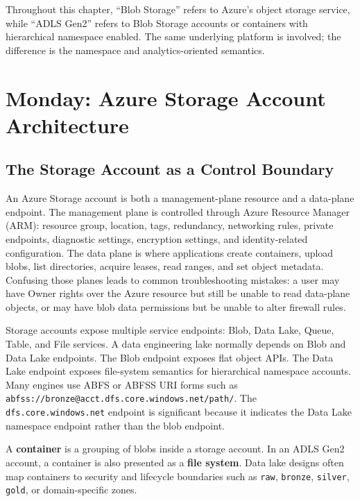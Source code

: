 \begin{notebox}
Throughout this chapter, ``Blob Storage'' refers to Azure's object storage service, while ``ADLS Gen2'' refers to Blob Storage accounts or containers with hierarchical namespace enabled. The same underlying platform is involved; the difference is the namespace and analytics-oriented semantics.
\end{notebox}

\section{Monday: Azure Storage Account Architecture}

\subsection{The Storage Account as a Control Boundary}
An Azure Storage account is both a management-plane resource and a data-plane endpoint. The management plane is controlled through Azure Resource Manager (ARM): resource group, location, tags, redundancy, networking rules, private endpoints, diagnostic settings, encryption settings, and identity-related configuration. The data plane is where applications create containers, upload blobs, list directories, acquire leases, read ranges, and set object metadata. Confusing those planes leads to common troubleshooting mistakes: a user may have Owner rights over the Azure resource but still be unable to read data-plane objects, or may have blob data permissions but be unable to alter firewall rules.

Storage accounts expose multiple service endpoints: Blob, Data Lake, Queue, Table, and File services. A data engineering lake normally depends on Blob and Data Lake endpoints. The Blob endpoint exposes flat object APIs. The Data Lake endpoint exposes file-system semantics for hierarchical namespace accounts. Many engines use ABFS or ABFSS URI forms such as \texttt{abfss://bronze@acct.dfs.core.windows.net/path/}. The \texttt{dfs.core.windows.net} endpoint is significant because it indicates the Data Lake namespace endpoint rather than the blob endpoint.

\begin{definitionbox}
A \textbf{container} is a grouping of blobs inside a storage account. In an ADLS Gen2 account, a container is also presented as a \textbf{file system}. Data lake designs often map containers to security and lifecycle boundaries such as \texttt{raw}, \texttt{bronze}, \texttt{silver}, \texttt{gold}, or domain-specific zones.
\end{definitionbox}

